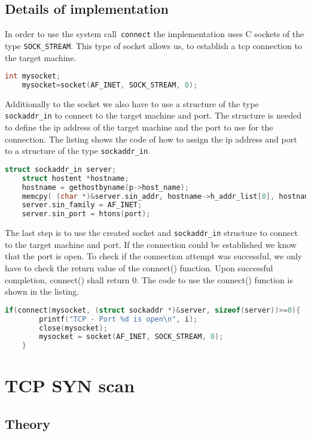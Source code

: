\documentclass[a4paper]{scrartcl}
\begin{document}
	\subsection{Details of implementation}
	In order to use the system call~\lstinline{connect} the implementation uses C sockets of the type \lstinline|SOCK_STREAM|. This type
	of socket allows us, to establish a tcp connection to the target machine.
	\begin{lstlisting}[frame= single, language=C, caption=C code to create a tcp socket in C]
	int mysocket;
	mysocket=socket(AF_INET, SOCK_STREAM, 0);
	\end{lstlisting}
	Additionally to the socket we also have to use a structure of the type \lstinline|sockaddr_in| to connect to the target machine and port.
	The structure is needed to define the ip address of the target machine and the port to use for the connection. The listing shows the
	code of how to assign the ip address and port to a structure of the type \lstinline|sockaddr_in|. 
	\begin{lstlisting}[frame= single, language=C, caption= C code to use the structure \lstinline|sockaddr_in|]
	struct sockaddr_in server;
	struct hostent *hostname;
	hostname = gethostbyname(p->host_name);
	memcpy( (char *)&server.sin_addr, hostname->h_addr_list[0], hostname->h_length);
	server.sin_family = AF_INET;
	server.sin_port = htons(port);
	\end{lstlisting}
	The last step is to use the created socket and  \lstinline|sockaddr_in| structure to connect to the target machine and port. If the 
	connection could be established we know that the port is open. To check if the connection attempt was successful, we only have to
	check the return value of the connect() function. Upon successful completion, connect() shall return 0. The code to use the connect() function is shown in the listing.
	\begin{lstlisting}[frame= single, language=C, caption= C code to use the connect() to check if port is open]
	if(connect(mysocket, (struct sockaddr *)&server, sizeof(server))>=0){
		printf("TCP - Port %d is open\n", i);
		close(mysocket);
		mysocket = socket(AF_INET, SOCK_STREAM, 0);
	}
	\end{lstlisting}
	
	\section{TCP SYN scan}
	\subsection{Theory}
	
\end{document}
